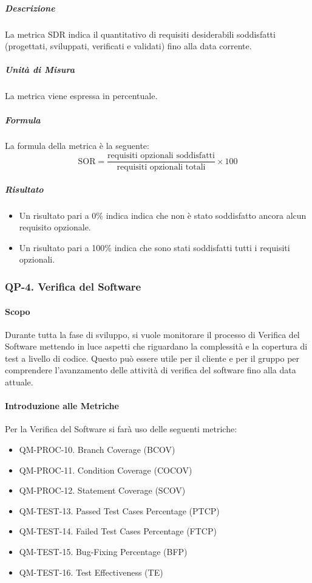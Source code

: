 			\subparagraph{Descrizione}
			La metrica SDR indica il quantitativo di requisiti desiderabili soddisfatti (progettati, sviluppati, verificati e validati) fino alla data corrente.

			\subparagraph{Unità di Misura}
			La metrica viene espressa in percentuale.

			\subparagraph{Formula}
			La formula della metrica è la seguente:
			\[
				\text{SOR} = \frac{\text{requisiti opzionali soddisfatti}}{\text{requisiti opzionali totali}} \times 100
			\]

			\subparagraph{Risultato}
			\begin{itemize}
				\item Un risultato pari a 0\% indica indica che non è stato soddisfatto ancora alcun requisito opzionale.
				\item Un risultato pari a 100\% indica che sono stati soddisfatti tutti i requisiti opzionali.
			\end{itemize}

	\subsubsection{QP-4. Verifica del Software}

		\paragraph{Scopo}
		
		Durante tutta la fase di sviluppo, si vuole monitorare il processo di Verifica del Software mettendo in luce aspetti che riguardano la complessità e la copertura di test a livello di codice. Questo può essere utile per il cliente e per il gruppo per comprendere l'avanzamento delle attività di verifica del software fino alla data attuale.

		\paragraph{Introduzione alle Metriche}

		Per la Verifica del Software si farà uso delle seguenti metriche:

		\begin{itemize}
			\item QM-PROC-10. Branch Coverage (BCOV)
			\item QM-PROC-11. Condition Coverage (COCOV)
			\item QM-PROC-12. Statement Coverage (SCOV)
			\item QM-TEST-13. Passed Test Cases Percentage (PTCP)
			\item QM-TEST-14. Failed Test Cases Percentage (FTCP)
			\item QM-TEST-15. Bug-Fixing Percentage (BFP)
			\item QM-TEST-16. Test Effectiveness (TE)
		\end{itemize}

